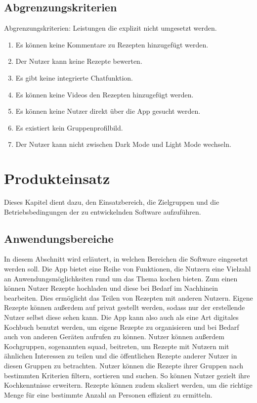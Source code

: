 \documentclass[parskip=full]{scrartcl}
\begin{document}
\subsection{Abgrenzungskriterien}
Abgrenzungskriterien: Leistungen die explizit nicht umgesetzt werden.

\begin{enumerate}[start=1,label={$\langle$\bfseries RW\arabic*$\rangle$}, leftmargin = 5em, itemsep=4pt, parsep=4pt]
    \item Es können keine Kommentare zu Rezepten hinzugefügt werden.
    \item Der Nutzer kann keine Rezepte bewerten.
    \item Es gibt keine integrierte Chatfunktion.
    \item Es können keine Videos den Rezepten hinzugefügt werden.
    \item Es können keine Nutzer direkt über die App gesucht werden.
    \item Es existiert kein Gruppenprofilbild.
    \item Der Nutzer kann nicht zwischen Dark Mode und Light Mode wechseln.
\end{enumerate}

\section{Produkteinsatz}
Dieses Kapitel dient dazu, den Einsatzbereich, die Zielgruppen und die Betriebsbedingungen der zu entwickelnden Software aufzuführen.

\subsection{Anwendungsbereiche}
In diesem Abschnitt wird erläutert, in welchen Bereichen die Software eingesetzt werden soll. \newline
Die App bietet eine Reihe von Funktionen, die Nutzern eine Vielzahl an Anwendungsmöglichkeiten rund um das Thema kochen bieten.
Zum einen können Nutzer Rezepte hochladen und diese bei Bedarf im Nachhinein bearbeiten.
Dies ermöglicht das Teilen von Rezepten mit anderen Nutzern. Eigene Rezepte können außerdem auf privat gestellt werden, sodass nur der erstellende Nutzer selbst diese sehen kann.
Die App kann also auch als eine Art digitales Kochbuch benutzt werden, um eigene Rezepte zu organisieren und bei Bedarf auch von anderen Geräten aufrufen zu können.
Nutzer können außerdem Kochgruppen, sogenannten \Gls{squad}, beitreten, um Rezepte mit Nutzern mit ähnlichen Interessen zu teilen und die öffentlichen Rezepte anderer Nutzer in diesen Gruppen zu betrachten. Nutzer können die Rezepte ihrer Gruppen nach bestimmten Kriterien filtern, sortieren und suchen. So können Nutzer gezielt ihre Kochkenntnisse erweitern.
Rezepte können zudem skaliert werden, um die richtige Menge für eine bestimmte Anzahl an Personen effizient zu ermitteln.
\end{document}
